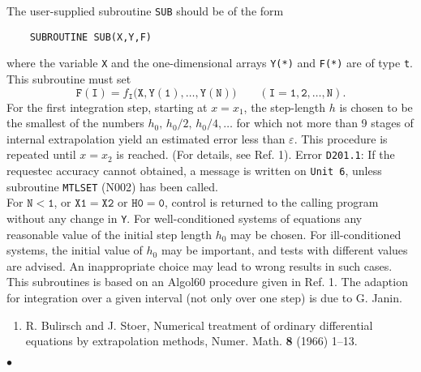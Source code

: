 The user-supplied subroutine {\tt SUB} should be of the form
\begin{verbatim}
    SUBROUTINE SUB(X,Y,F)
\end{verbatim}
where the variable {\tt X} and the one-dimensional arrays {\tt Y(*)} and
{\tt F(*)} are of type {\tt t}. This subroutine must set
$$\mathtt{F(I)} = f_{\mathtt{I}}(\mathtt{X,Y(1),\ldots,Y(N))} \qquad
(\mathtt{I = 1,2,\ldots,N}).$$
\newpage
\Method
For the first integration step, starting at $x=x_1$, the step-length
$h$ is chosen to be the smallest of the numbers $h_0,\,h_0/2,\,
h_0/4,\ldots$ for which not more than 9 stages of internal
extrapolation yield an estimated error less than $\varepsilon$. This
procedure is repeated until $x=x_2$ is reached.
(For details, see Ref. 1).
\Errorh
Error {\tt D201.1}: If the requestec accuracy cannot obtained,
a message is written on
{\tt Unit 6}, unless subroutine {\tt MTLSET} (N002) has been called. \\
For $\mathtt{N<1}$, or $\mathtt{X1=X2}$ or $\mathtt{H0=0}$, control
is returned to the calling program without any change in {\tt Y}.
\Notes
For well-conditioned systems of equations any reasonable value of the
initial step length $h_0$ may be chosen. For ill-conditioned systems,
the initial value of $h_0$ may be important, and tests with different
values are advised. An inappropriate choice may lead to wrong results in
such cases.
\Source
This subroutines is based on an Algol60 procedure given in Ref. 1.
The adaption for integration over a given interval (not only over one
step) is due to G. Janin.
\Refer
\begin{enumerate}
\item  R. Bulirsch and J. Stoer, Numerical treatment of ordinary
differential equations by extrapolation methods,
Numer. Math. {\bf 8} (1966) 1--13.
\end{enumerate}
$\bullet$
